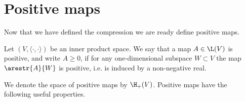 \section{Positive maps}

Now that we have defined the compression we are ready define positive maps.

\begin{maar}
	Let $(V, \langle \cdot, \cdot \rangle)$ be an inner product space. We say that a map $A \in \L(V)$ is positive, and write $A \geq 0$, if for any one-dimensional subspace $W \subset V$ the map $\arestr{A}{W}$ is positive, i.e. is induced by a non-negative real.
\end{maar}

We denote the space of positive maps by $\H_{+}(V)$. Positive maps have the following useful properties.

